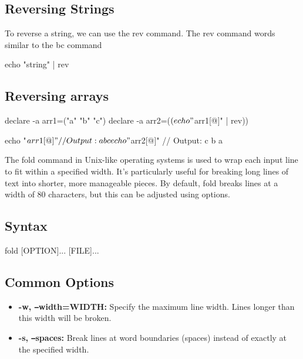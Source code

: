 \documentclass{report}
\begin{document}
    \subsection{Reversing Strings}
    \bigbreak \noindent 
    To reverse a string, we can use the rev command. The rev command words similar to the bc command
    \bigbreak \noindent 
    \begin{bashcode}
    echo "string" | rev
    \end{bashcode}

    \bigbreak \noindent 
    \subsection{Reversing arrays}
    \bigbreak \noindent 
    \begin{bashcode}
    declare -a arr1=("a" "b" "c")
    declare -a arr2=($(echo "${arr1[@]}" | rev))

    echo "${arr1[@]}" // Output: a b c
    echo "${arr2[@]}" // Output: c b a
    \end{bashcode}

    \pagebreak 
    \bigbreak \noindent 
    The fold command in Unix-like operating systems is used to wrap each input line to fit within a specified width. It's particularly useful for breaking long lines of text into shorter, more manageable pieces. By default, fold breaks lines at a width of 80 characters, but this can be adjusted using options.
    \bigbreak \noindent 
    \subsection{Syntax}
    \bigbreak \noindent 
    \begin{bashcode}
        fold [OPTION]... [FILE]...
    \end{bashcode}
    \bigbreak \noindent 
    \subsection{Common Options}
    \begin{itemize}
        \item \textbf{-w, \texttt{--}width=WIDTH:} Specify the maximum line width. Lines longer than this width will be broken.
        \item \textbf{-s, \texttt{--}spaces:} Break lines at word boundaries (spaces) instead of exactly at the specified width.
    \end{itemize}
    \bigbreak \noindent 
\end{document}
